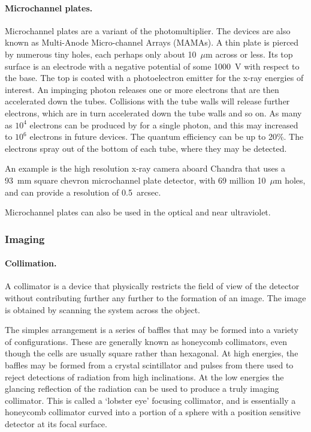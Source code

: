 \documentclass{article}
\begin{document}
\paragraph{Microchannel plates.} Microchannel plates are a variant of the photomultiplier. The devices 
are also known as Multi-Anode Micro-channel Arrays (MAMAs). A thin plate is pierced by numerous tiny holes, each perhaps only about 10~$\mu$m across or less. Its top surface is
an electrode with a negative potential of some 1000~V with respect to the base. The top is
coated with a photoelectron emitter for the x-ray energies of interest. An impinging photon
releases one or more electrons that are then accelerated down the tubes. Collisions with the tube
walls will release further electrons, which are in turn accelerated down the tube walls and so on.
As many as $10^4$ electrons can be produced by for a single photon, and this may increased
to $10^6$ electrons in future devices. The quantum efficiency can be up to 20\%. The electrons
spray out of the bottom of each tube, where they may be detected. 

An example is the high resolution x-ray camera aboard Chandra that uses a 93~mm square
chevron microchannel plate detector, with 69 million 10~$\mu$m holes, and can provide a
resolution of 0.5~arcsec. 

Microchannel plates can also be used in the optical and near ultraviolet.

\subsubsection{Imaging}

\paragraph{Collimation.} A collimator is a device that physically restricts the field of view of the detector
without contributing further any further to the formation of an image. The image is obtained by 
scanning the system across the object. 

The simples arrangement is a series of baffles that may be formed into a variety of configurations. These are generally known as honeycomb collimators, even though the cells are
usually square rather than hexagonal. At high energies, the baffles may be formed from 
a crystal scintillator and pulses from there used to reject detections of radiation from
high inclinations. At the low energies the glancing reflection of the radiation can be used
to produce a truly imaging collimator. This is called a `lobster eye' focusing collimator, 
and is essentially a honeycomb collimator curved into a portion of a sphere with a position 
sensitive detector at its focal surface. 
\end{document}
